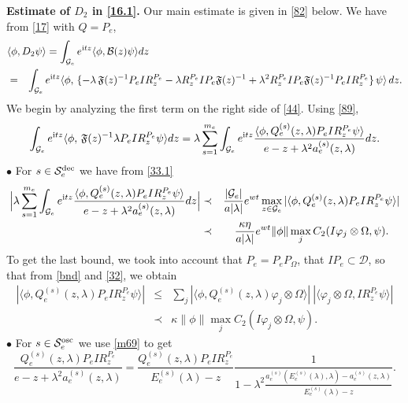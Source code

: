 \documentclass[letterpaper,onecolumn,11pt,accepted=2021-12-09]{quantumarticle}
\numberwithin{equation}{section}
\newcommand{\aes}{a_e^{(s)}}
\newcommand{\Qes}{Q_e^{(s)}}
\newcommand{\Ees}{E_e^{(s)}(\lambda)}
\renewcommand{\i}{{\rm i}}
\begin{document}
\noindent
{\bf Estimate of $D_2$ in \eqref{16.1}. }  Our main estimate is given in \eqref{82} below. 
We have from \eqref{17} with $Q=P_e$, 
\begin{eqnarray}
	\label{44}
\lefteqn{ \langle \phi, D_2\psi\rangle =\int_{{\mathcal G}_e} e^{\i t z} \langle\phi, {\mathcal B}(z)\psi\rangle dz}\\
&=&\int_{{\mathcal G}_e} e^{\i tz}\langle \phi,   \, \{-\lambda\, {\mathfrak F}(z)^{-1}  P_e I R_z^{P_e} - \lambda R_z^{P_e} I P_e {\mathfrak F}(z)^{-1} +\lambda^2 R_z^{P_e} I P_e{\mathfrak F}(z)^{-1} P_e I R_z^{P_e} \}\,    \psi \rangle \, dz.
\nonumber
\end{eqnarray}
We begin by analyzing the first term on the right side of \eqref{44}. Using \eqref{89},
\begin{equation}
\int_{{\mathcal G}_e} e^{\i tz}\langle \phi,   \, {\mathfrak F}(z)^{-1} \lambda P_e I R_z^{P_e} \psi\rangle dz = \lambda\sum_{s=1}^{m_e} \int_{{\mathcal G}_e}e^{\i tz} \frac{ \langle\phi, \Qes(z,\lambda)P_e IR^{P_e}_z \psi\rangle  }{e-z+\lambda^2 \aes(z,\lambda)} dz.
\label{71.1}
\end{equation}
$\bullet$ For $s\in{\mathcal S}_e^{\rm dec}$ we have from \eqref{33.1}
\begin{eqnarray}
\Big| \lambda\sum_{s=1}^{m_e} \int_{{\mathcal G}_e}e^{\i tz}\frac{ \langle\phi, \Qes(z,\lambda)P_e IR^{P_e}_z \psi\rangle  }{e-z+\lambda^2 \aes(z,\lambda)} dz\Big| &\prec& \frac{|{\mathcal G}_e|}{a|\lambda|}e^{w t} \max_{z\in{\mathcal G}_e} | \langle\phi, \Qes(z,\lambda)P_e IR^{P_e}_z \psi\rangle |\nonumber\\  
&\prec& \frac{\kappa\eta}{a|\lambda|}e^{w t}\|\phi\|  \max_j C_2(I\varphi_j\otimes\Omega, \psi).\quad
\label{m101}
\end{eqnarray}
To get the last bound, we took into account that  $P_e=P_e P_\Omega$, that $IP_e\subset {\mathcal D}$,  so that from  \eqref{bnd} and \eqref{32}, we obtain
\begin{eqnarray}
| \langle\phi, \Qes(z,\lambda)P_e IR^{P_e}_z \psi\rangle | &\le& \sum_j |\langle \phi, \Qes(z,\lambda)\varphi_j\otimes\Omega\rangle |\ |\langle\varphi_j\otimes\Omega, IR_z^{P_e}\psi\rangle| \nonumber\\
&\prec&\kappa \|\phi\|  \max_j C_2(I\varphi_j\otimes\Omega, \psi).
\label{m102.1}
\end{eqnarray}
$\bullet$ For $s\in{\mathcal S}_e^{\rm osc}$ we use \eqref{m69} to get
\begin{equation}
\frac{\Qes(z,\lambda)P_eIR_z^{P_e}}{e-z+\lambda^2\aes(z,\lambda)} =\frac{\Qes(z,\lambda)P_eIR_z^{P_e}}{\Ees-z} \frac{1}{1-\lambda^2\frac{\aes(\Ees,\lambda) - \aes(z,\lambda)}{\Ees -z}}.
\label{m102}
\end{equation}
\end{document}
